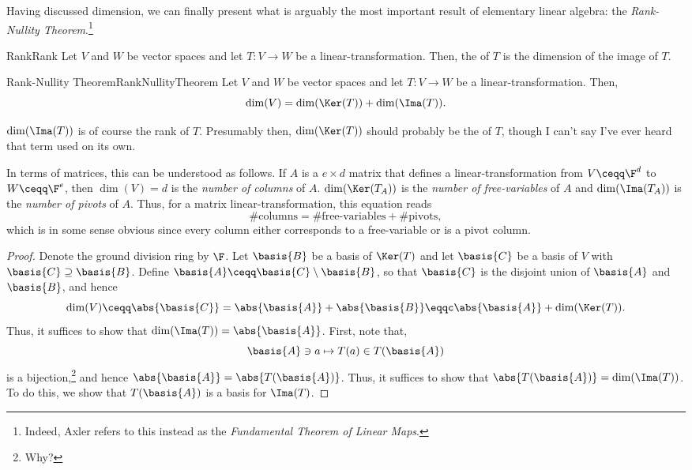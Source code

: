 Having discussed dimension, we can finally present what is arguably the most important result of elementary linear algebra:  the \emph{Rank-Nullity Theorem}.\footnote{Indeed, Axler \cite{Axler} refers to this instead as the \emph{Fundamental Theorem of Linear Maps}.}
\begin{dfn}{Rank}{Rank}
	Let $V$ and $W$ be vector spaces and let $T\colon V\rightarrow W$ be a linear-transformation.  Then, the  of $T$ is the dimension of the image of $T$.
\end{dfn}
\begin{thm}{Rank-Nullity Theorem}{RankNullityTheorem}
	Let $V$ and $W$ be vector spaces and let $T\colon V\rightarrow W$ be a linear-transformation.  Then,
	\begin{equation}
		\dim (V)=\dim (\Ker (T))+\dim (\Ima (T)).
	\end{equation}
	\begin{rmk}
		$\dim (\Ima (T))$ is of course the rank of $T$.  Presumably then, $\dim (\Ker (T))$ should probably be the  of $T$, though I can't say I've ever heard that term used on its own.
	\end{rmk}
	\begin{rmk}
		In terms of matrices, this can be understood as follows.  If $A$ is a $e\times d$ matrix that defines a linear-transformation from $V\ceqq \F ^d$ to $W\ceqq \F ^e$, then $\dim (V)=d$ is the \emph{number of columns} of $A$.  $\dim (\Ker (T_A))$ is the \emph{number of free-variables} of $A$ and $\dim (\Ima (T_A))$ is the \emph{number of pivots} of $A$.  Thus, for a matrix linear-transformation, this equation reads
		\begin{equation}
			\text{\# columns}=\text{\# free-variables}+\text{\# pivots},
		\end{equation}
		which is in some sense obvious since every column either corresponds to a free-variable or is a pivot column.
	\end{rmk}
	\begin{proof}
		Denote the ground division ring by $\F$.  Let $\basis{B}$ be a basis of $\Ker (T)$ and let $\basis{C}$ be a basis of $V$ with $\basis{C}\supseteq \basis{B}$.  Define $\basis{A}\ceqq \basis{C}\setminus \basis{B}$, so that $\basis{C}$ is the disjoint union of $\basis{A}$ and $\basis{B}$, and hence
		\begin{equation}
			\dim (V)\ceqq \abs{\basis{C}}=\abs{\basis{A}}+\abs{\basis{B}}\eqqc \abs{\basis{A}}+\dim (\Ker (T)).
		\end{equation}
		Thus, it suffices to show that $\dim (\Ima (T))=\abs{\basis{A}}$.  First, note that,
		\begin{equation}
			\basis{A}\ni a\mapsto T(a)\in T(\basis{A})
		\end{equation}
		is a bijection,\footnote{Why?} and hence $\abs{\basis{A}}=\abs{T(\basis{A})}$.  Thus, it suffices to show that $\abs{T(\basis{A})}=\dim (\Ima (T))$.  To do this, we show that $T(\basis{A})$ is a basis for $\Ima (T)$.
		

\end{proof}
\end{thm}
